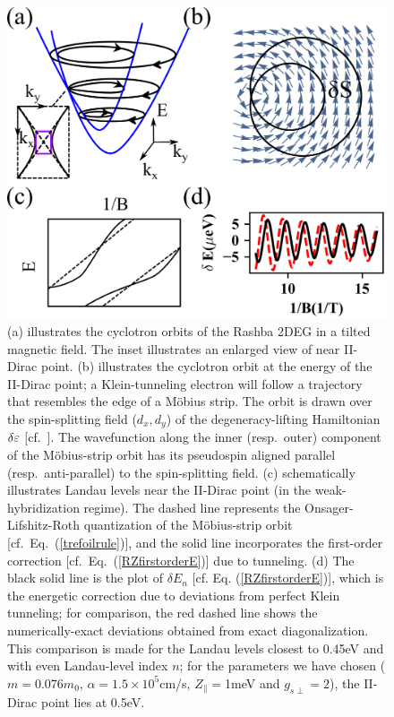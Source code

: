 \documentclass[aps, showpacs, twocolumn, notitlepage, superscriptaddress]{revtex4-1}
\begin{document}
\begin{figure}
\includegraphics[width=1.0\columnwidth]{RZ.png}
\caption{(a) illustrates the cyclotron orbits of the Rashba 2DEG in a tilted magnetic field. The inset illustrates an enlarged view of near II-Dirac point. (b) illustrates the cyclotron orbit at the energy of the II-Dirac point; a Klein-tunneling electron will follow a trajectory that resembles the edge of a M\"obius strip. The orbit is drawn over the  spin-splitting field ($d_x,d_y$) of the degeneracy-lifting Hamiltonian $\delta\varepsilon$ [cf.\ ]. The wavefunction along the inner (resp.\ outer) component of the M\"obius-strip orbit has its pseudospin aligned parallel (resp.\ anti-parallel) to the spin-splitting field. (c) schematically illustrates  Landau levels near the II-Dirac point (in the weak-hybridization regime). The dashed line represents the Onsager-Lifshitz-Roth quantization of the M\"obius-strip orbit [cf.\ Eq.\ (\ref{trefoilrule})], and the solid line incorporates the first-order correction [cf.\ Eq.\ (\ref{RZfirstorderE})] due to tunneling. (d) The black solid line is the plot of $\delta E_n$ [cf. Eq. (\ref{RZfirstorderE})], which is the energetic correction due to deviations from perfect Klein tunneling; for comparison, the red dashed line shows the numerically-exact deviations obtained from exact diagonalization. This comparison is made for the Landau levels closest to 0.45eV and with even Landau-level index $n$; for the parameters we have chosen ($m{=}0.076m_0$, $\alpha{=} 1.5\times10^{5}$cm/s, $Z_\parallel {=}$1meV and $g_{s\perp}=2$),  the II-Dirac point lies at 0.5eV. 
\label{fig:RZ}}
\end{figure}
\end{document}
